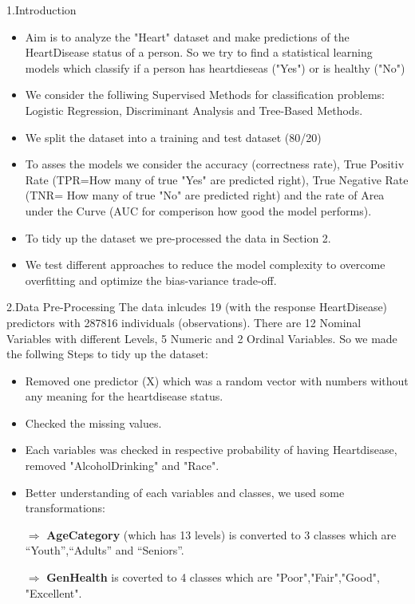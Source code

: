 \documentclass[xcolor=dvipsnames]{beamer}
\begin{document}
\begin{frame}{1.Introduction}
\begin{itemize}
\item Aim is to analyze the "Heart" dataset and make predictions of the HeartDisease status of a person. So we try to find a statistical learning models which classify if a person has heartdieseas ("Yes") or is healthy ("No")
\item We consider the folliwing Supervised Methods for classification problems: Logistic Regression, Discriminant Analysis and Tree-Based Methods.
\item We split the dataset into a training and test dataset (80/20)
\item To asses the models we consider the accuracy (correctness rate), True Positiv Rate (TPR=How many of true "Yes" are predicted right), True Negative Rate (TNR= How many of true "No" are predicted right) and the rate of Area under the Curve (AUC for comperison how good the model performs).
\item To tidy up the dataset we pre-processed the data in Section 2.
\item We test different approaches to reduce the model complexity to overcome overfitting and optimize the bias-variance trade-off. 
\end{itemize}
\end{frame}


\begin{frame}{2.Data Pre-Processing}
The data inlcudes 19 (with the response HeartDisease) predictors with 287816 individuals (observations). There are 12 Nominal Variables with different Levels, 5 Numeric and 2 Ordinal Variables. So we made the follwing Steps to tidy up the dataset:
\begin{itemize}
\item Removed one predictor (X) which was a random vector with numbers without any meaning for the heartdisease status.
\item Checked the missing values.
\item Each variables was checked in respective probability of having Heartdisease, removed "AlcoholDrinking" and "Race".
\item Better understanding of each variables and classes, we used some transformations:
\begin{itemize}
$\Rightarrow$ \textbf{AgeCategory} (which has 13 levels) is converted to 3 classes which are “Youth”,“Adults” and “Seniors”.

\newline $\Rightarrow$ \textbf{GenHealth} is coverted to 4 classes which are "Poor","Fair","Good", "Excellent".

\end{itemize}
\end{itemize}
\end{frame}
\end{document}
